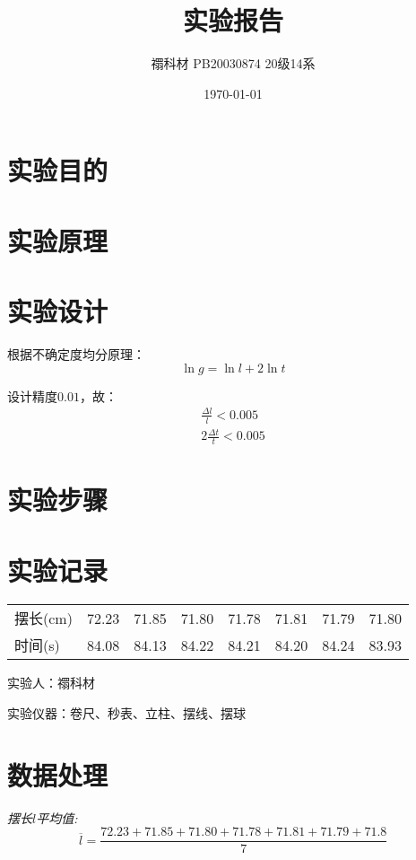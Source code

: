 \documentclass[UTF8]{ctexart}
\title{实验报告}
\author{禤科材 PB20030874 20级14系}
\date{\today}
\begin{document}
    \maketitle

    \section{实验目的}
    
    \section{实验原理}


    \section{实验设计}
    根据不确定度均分原理：
    \begin{equation}
        \ln g = \ln l + 2\ln t
    \end{equation}

    设计精度$0.01$，故：
    \begin{gather}
        \frac{\varDelta l}{l}<0.005 \\
        2\frac{\varDelta t}{t}<0.005
    \end{gather}
    \section{实验步骤}

    \section{实验记录}
    \begin{center}
        \begin{tabular}{llllllll}
            摆长(cm)   & 72.23 & 71.85 & 71.80 & 71.78 & 71.81 & 71.79 & 71.80 \\
            时间(s)    & 84.08 & 84.13 & 84.22 & 84.21 & 84.20 & 84.24 & 83.93 \\
            \hline
        \end{tabular}

    实验人：禤科材

    实验仪器：卷尺、秒表、立柱、摆线、摆球
\end{center}


    \section{数据处理}
        \emph{摆长$l$平均值:}
        \begin{equation}
            \overline{l}=\frac{72.23 + 71.85 + 71.80 +71.78 + 71.81+ 71.79+71.8}{7}
        \end{equation}
\end{document}
